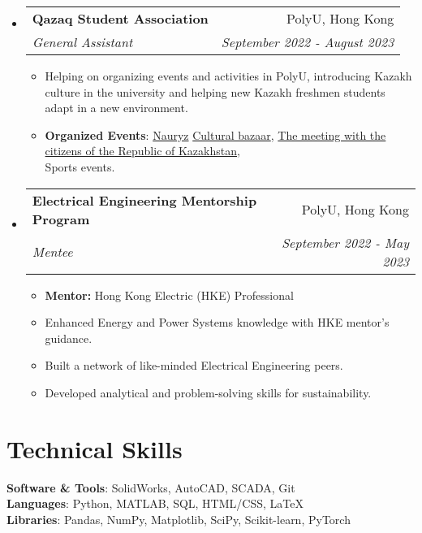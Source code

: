 \documentclass[letterpaper,11pt]{article}
\makeatletter
\newcommand{\resumeItem}[1]{
  \item\small{
    {#1 \vspace{-2pt}}
  }
}
\newcommand{\resumeSubheading}[4]{
  \vspace{-2pt}\item
    \begin{tabular*}{0.97\textwidth}[t]{l@{\extracolsep{\fill}}r}
      \textbf{#1} & #2 \\
      \textit{\small#3} & \textit{\small #4} \\
    \end{tabular*}\vspace{-7pt}
}
\newcommand{\resumeProjectHeading}[2]{
    \item
    \begin{tabular*}{0.97\textwidth}{l@{\extracolsep{\fill}}r}
      \small#1 & #2 \\
    \end{tabular*}\vspace{-7pt}
}
\newcommand{\resumeSubHeadingListStart}{\begin{itemize}[leftmargin=0.15in, label={}]}
\newcommand{\resumeSubHeadingListEnd}{\end{itemize}}
\newcommand{\resumeItemListStart}{\begin{itemize}}
\newcommand{\resumeItemListEnd}{\end{itemize}\vspace{-5pt}}
\makeatother
\begin{document}
  \resumeSubHeadingListStart
    \resumeSubheading
      {Qazaq Student Association}{PolyU, Hong Kong}
      {General Assistant}{September 2022 - August 2023}
      \resumeItemListStart
        \resumeItem{ Helping on organizing events and activities in PolyU, introducing Kazakh culture in the university and helping new Kazakh 
freshmen students adapt in a new environment.}
        \resumeItem{\textbf{Organized Events}: \href{https://www.instagram.com/p/CqADZ76P7UP/?img_index=1}{Nauryz} \href{https://www.polyu.edu.hk/en/sao/student-development-section/holistic-student-development/on-campus-intercultural-development-programmes/gcb/}{Cultural bazaar}, \href{https://www.gov.kz/memleket/entities/mfa-hongkong/press/news/details/458640?lang=en}{The meeting with the citizens of the Republic of Kazakhstan}, \\ Sports events.}
      \resumeItemListEnd

  \resumeSubHeadingListEnd

  \resumeSubHeadingListStart
    \resumeSubheading
      {Electrical Engineering Mentorship Program }{PolyU, Hong Kong}
      {Mentee}{September 2022 - May 2023}
      \resumeItemListStart
        \resumeItem{\textbf{Mentor:} Hong Kong Electric (HKE) Professional}
        \resumeItem{Enhanced Energy and Power Systems knowledge with HKE mentor's guidance.}
        \resumeItem{Built a network of like-minded Electrical Engineering peers.}
        \resumeItem{Developed analytical and problem-solving skills for sustainability.}
      \resumeItemListEnd

  \resumeSubHeadingListEnd


%
\section{Technical Skills}
 \begin{itemize}[leftmargin=0.15in, label={}]
    \small{\item{
     \textbf{Software \& Tools}{: SolidWorks, AutoCAD, SCADA, Git} \\
     \textbf{Languages}{: Python, MATLAB, SQL, HTML/CSS, LaTeX} \\
     \textbf{Libraries}{: Pandas, NumPy, Matplotlib,  SciPy, Scikit-learn, PyTorch} 
     
    }}
 \end{itemize}


\end{document}
